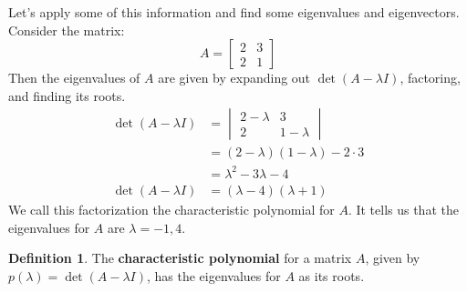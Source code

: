 \documentclass[11pt]{amsart}
\theoremstyle{definition}
\newtheorem{definition}[theorem]{Definition}
\begin{document}
Let's apply some of this information and find some eigenvalues and eigenvectors. Consider the matrix:
\[
	A = \begin{bmatrix} 2 & 3 \\ 2 & 1 \end{bmatrix}
\]
Then the eigenvalues of $A$ are given by expanding out $\det(A - \lambda I)$, factoring, and finding its roots.
\begin{align*}
	\det(A - \lambda I) &= \begin{vmatrix} 2 - \lambda & 3 \\ 2 & 1 - \lambda \end{vmatrix} \\
	&= (2 - \lambda)(1 - \lambda) - 2 \cdot 3 \\
	&= \lambda^2 - 3\lambda - 4 \\
	\det(A - \lambda I) &= (\lambda - 4)(\lambda + 1)
\end{align*}
We call this factorization the characteristic polynomial for $A$. It tells us that the eigenvalues for $A$ are $\lambda = -1, 4$.
\begin{definition}
	The \textbf{characteristic polynomial} for a matrix $A$, given by $p(\lambda) = \det(A - \lambda I)$, has the eigenvalues for $A$ as its
	roots.
\end{definition}
\end{document}
